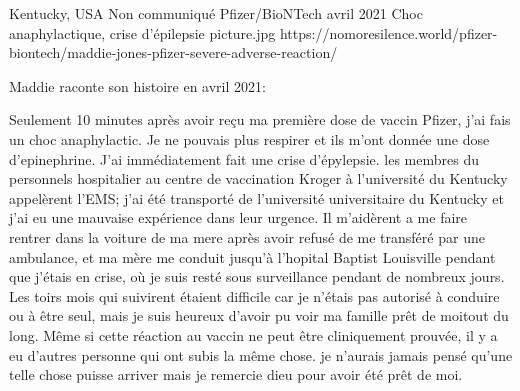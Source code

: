           {Kentucky, USA}
          {Non communiqué}
          {Pfizer/BioNTech}
          {avril 2021}
          {Choc anaphylactique, crise d'épilepsie}
          {picture.jpg}
          {https://nomoresilence.world/pfizer-biontech/maddie-jones-pfizer-severe-adverse-reaction/}
          {
Maddie raconte son histoire en avril 2021:

Seulement 10 minutes après avoir reçu ma première dose de vaccin Pfizer, j'ai
fais un choc anaphylactic. Je ne pouvais plus respirer et ils m'ont donnée une
dose d'epinephrine. J'ai immédiatement fait une crise d'épylepsie. les membres
du personnels hospitalier au centre de vaccination Kroger à l'université du
Kentucky appelèrent l'EMS; j'ai été transporté de l'université universitaire du
Kentucky et j'ai eu une mauvaise expérience dans leur urgence. Il m'aidèrent a
me faire rentrer dans la voiture de ma mere après avoir refusé de me transféré
par une ambulance, et ma mère me conduit jusqu'à l'hopital Baptist Louisville
pendant que j'étais en crise, où je suis resté sous surveillance pendant de
nombreux jours. Les toirs mois qui suivirent étaient difficile car je n'étais
pas autorisé à conduire ou à être seul, mais je suis heureux d'avoir pu voir ma
famille prêt de moitout du long. Même si cette réaction au vaccin ne peut être
cliniquement prouvée, il y a eu d'autres personne qui ont subis la même
chose. je n'aurais jamais pensé qu'une telle chose puisse arriver mais je
remercie dieu pour avoir été prêt de moi.

}
